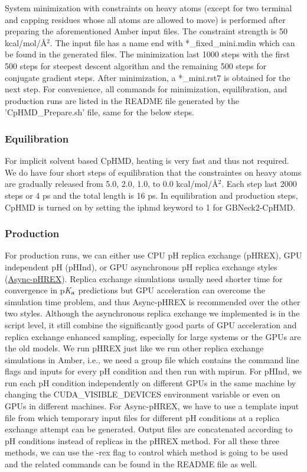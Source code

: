 \documentclass[9pt,tutorial]{livecoms}
\newcommand{\pka}{p\textit{K}$_{\rm a}$}
\begin{document}
System minimization with constraints on heavy atoms (except for two terminal and capping residues whose all atoms are allowed to move) is performed after preparing the aforementioned Amber input files. The constraint strength is 50 kcal/mol/\AA$^2$. The input file has a name end with *\_fixed\_mini.mdin which can be found in the generated files. The minimization last 1000 steps with the first 500 steps for steepest descent algorithm and the remaining 500 steps for conjugate gradient steps. After minimization, a *\_mini.rst7 is obtained for the next step. For convenience, all commands for minimization, equilibration, and production runs are listed in the README file generated by the 'CpHMD\_Prepare.sh' file, same for the below steps.

\subsubsection{Equilibration}
For implicit solvent based CpHMD, heating is very fast and thus not required. We do have four short steps of equilibration that the constraintes on heavy atoms are gradually released from 5.0, 2.0, 1.0, to 0.0 kcal/mol/\AA$^2$. Each step last 2000 steps or 4 ps and the total length is 16 ps. In equilibration and production steps, CpHMD is turned on by setting the iphmd keyword to 1 for GBNeck2-CpHMD.

\subsubsection{Production}
For production runs, we can either use CPU pH replica exchange (pHREX), GPU independent pH (pHInd), or GPU asynchronous pH replica exchange styles (\href{https://gitlab.com/shenlab-amber-cphmd/async_ph_replica_exchange}{Async-pHREX}). Replica exchange simulations usually need shorter time for convergence in {\pka} predictions but GPU acceleration can overcome the simulation time problem, and thus Async-pHREX is recommended over the other two styles. Although the asynchronous replica exchange we implemented is in the script level, it still combine the significantly good parts of GPU acceleration and replica exchange enhanced sampling, especially for large systems or the GPUs are the old models. We run pHREX just like we run other replica exchange simulations in Amber, i.e., we need a group file which contains the command line flags and inputs for every pH condition and then run with mpirun. For pHInd, we run each pH condition independently on different GPUs in the same machine by changing the CUDA\_VISIBLE\_DEVICES environment variable or even on GPUs in different machines. For Async-pHREX, we have to use a template input file from which temporary input files for different pH conditions at a replica exchange attempt can be generated. Output files are concatenated according to pH conditions instead of replicas in the pHREX method. For all these three methods, we can use the -rex flag to control which method is going to be used and the related commands can be found in the README file as well.
\end{document}
